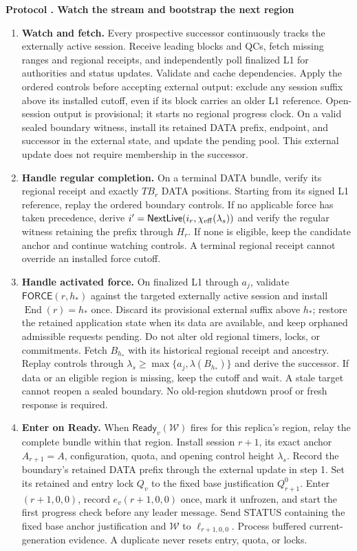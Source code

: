 \documentclass[11pt,a4paper]{article}
\newcommand{\tagg}[1]{\ensuremath{\mathsf{#1}}}
\newcounter{protocol}
\newenvironment{protocol}[2]{\refstepcounter{protocol}\label{#1}
\begin{mdframed}[nobreak=true,linewidth=.6pt,skipabove=8pt,skipbelow=8pt,
innertopmargin=7pt,innerbottommargin=7pt]\small
\textbf{Protocol \theprotocol. #2}\par\smallskip}{\end{mdframed}}
\begin{document}
\begin{protocol}{alg:bootstrap}{Watch the stream and bootstrap the next region}
\color{rrRed}
\begin{enumerate}[label=\textbf{\arabic*)},itemsep=5pt]
\item \textbf{Watch and fetch.} Every prospective successor continuously
tracks the externally active session. Receive leading blocks and QCs,
fetch missing ranges and regional receipts, and independently poll
finalized L1 for authorities and status updates. Validate and cache
dependencies. Apply the ordered controls before accepting external
output: exclude any session suffix above its installed cutoff, even if
its block carries an older L1 reference. Open-session output is
provisional; it starts no regional progress clock.
On a valid sealed boundary witness, install its retained DATA prefix,
endpoint, and successor in the external state, and update the pending
pool. This external update does not require membership in the successor.

\item \textbf{Handle regular completion.} On a terminal DATA bundle,
verify its regional receipt and exactly $TB_r$ DATA positions. Starting
from its signed L1 reference, replay the ordered boundary controls.
If no applicable force has taken precedence, derive
$i'=\tagg{NextLive}(i_r,\chi_{\rm eff}(\lambda_s))$ and verify the
regular witness retaining the prefix through $H_r$. If none is eligible,
keep the candidate anchor and continue watching controls. A terminal
regional receipt cannot override an installed force cutoff.

\item \textbf{Handle activated force.} On finalized L1 through $a_j$,
validate $\tagg{FORCE}(r,h_*)$ against the targeted externally active
session and install $\operatorname{End}(r)=h_*$ once. Discard its
provisional external suffix above $h_*$; restore the retained application
state when its data are available, and keep orphaned admissible requests
pending. Do not alter old regional timers, locks, or commitments.
Fetch $B_{h_*}$ with its historical regional receipt and ancestry.
Replay controls through $\lambda_s\ge\max\{a_j,\lambda(B_{h_*})\}$ and
derive the successor. If data or an eligible region is missing, keep the
cutoff and wait. A stale target cannot reopen a sealed boundary.
No old-region shutdown proof or fresh response is required.

\item \textbf{Enter on Ready.} When $\tagg{Ready}_v(\mathcal W)$ fires
for this replica's region, relay the complete bundle within that region.
Install session $r+1$, its exact anchor $A_{r+1}=A$, configuration, quota,
and opening control height $\lambda_s$. Record the boundary's retained
DATA prefix through the external update in step 1. Set its retained and entry lock
$Q_v$ to the fixed base justification $Q_{r+1}^0$. Enter $(r+1,0,0)$, record
$e_v(r+1,0,0)$ once, mark it unfrozen, and start the first progress check
before any leader message. Send STATUS containing the fixed base anchor
justification and $\mathcal W$ to $\ell_{r+1,0,0}$. Process buffered
current-generation evidence. A duplicate never resets entry, quota, or locks.


\end{enumerate}
\end{protocol}
\end{document}

